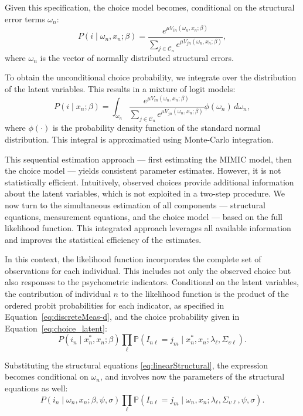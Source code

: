 \documentclass[12pt,a4paper]{article}
\begin{document}
Given this specification, the choice model becomes, conditional on the structural error terms \( \omega_n \):
\begin{equation}
P(i \mid \omega_n, x_n; \beta) = \frac{e^{\mu V_{in}(\omega_n, x_n; \beta)}}{\sum_{j \in \mathcal{C}_n} e^{\mu V_{jn}(\omega_n, x_n; \beta)}},
\end{equation}
where \( \omega_n \) is the vector of normally distributed structural errors.

To obtain the unconditional choice probability, we integrate over the distribution of the latent variables. This results in a mixture of logit models:
\begin{equation}
P(i \mid x_n; \beta) = \int_{\omega_n} \frac{e^{\mu V_{in}(\omega_n, x_n; \beta)}}{\sum_{j \in \mathcal{C}_n} e^{\mu V_{jn}(\omega_n, x_n; \beta)}} \phi(\omega_n) \, d\omega_n,
\end{equation}
where \( \phi(\cdot) \) is the probability density function of the standard normal distribution.
This integral is approximatied using Monte-Carlo integration.

This sequential estimation approach --- first estimating the MIMIC model, then the choice model --- yields consistent parameter estimates. However, it is not statistically efficient. Intuitively, observed choices provide additional information about the latent variables, which is not exploited in a two-step procedure. We now turn to the simultaneous estimation of all components --- structural equations, measurement equations, and the choice model --- based on the full likelihood function. This integrated approach leverages all available information and improves the statistical efficiency of the estimates.

In this context, the likelihood function incorporates the complete set of observations for each individual. This includes not only the observed choice but also responses to the psychometric indicators. Conditional on the latent variables, the contribution of individual \( n \) to the likelihood function is the product of the ordered probit probabilities for each indicator, as specified in Equation~\eqref{eq:discreteMeas-d}, and the choice probability given in Equation~\eqref{eq:choice_latent}:
\[
P(i_n \mid x_n^*, x_n; \beta) \prod_\ell \mathbb{P}(I_{n\ell} = j_m \mid x_n^*, x_n; \lambda_\ell, \Sigma_{\upsilon \ell}).
\]

Substituting the structural equations \eqref{eq:linearStructural}, the expression becomes conditional on \( \omega_n \), and involves now the parameters of the structural equations as well:
\[
P(i_n \mid \omega_n, x_n; \beta, \psi, \sigma) \prod_\ell \mathbb{P}(I_{n\ell} = j_m \mid \omega_n, x_n; \lambda_\ell, \Sigma_{\upsilon \ell}, \psi, \sigma).
\]
\end{document}
